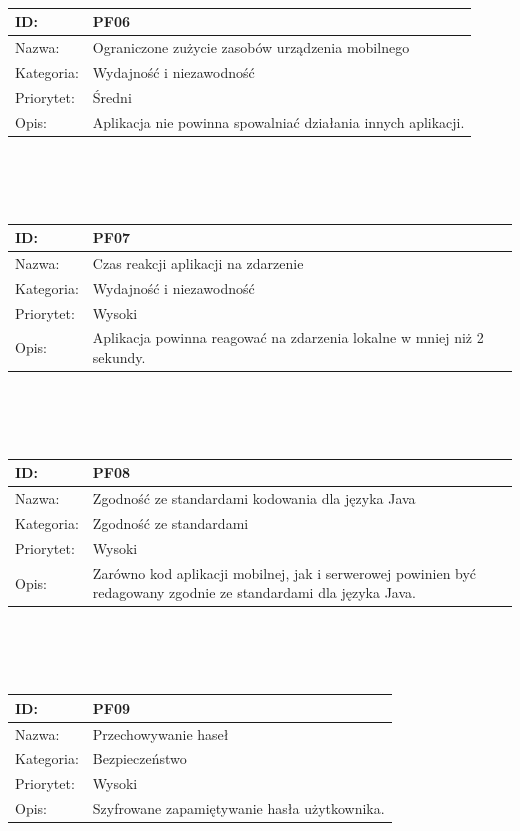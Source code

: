 \documentclass[11pt,a4paper,polish,thesis]{dcsbook}
\begin{document}
\begin{tabular}{|p{2cm}|p{12cm}|}
\\ \hline \end{tabular} \\\\\ \begin{tabular}{|p{2cm}|p{12cm}|}  \hline ID: &
PF06
\\ \hline Nazwa: &
Ograniczone zużycie zasobów urządzenia mobilnego
\\ \hline Kategoria: &
Wydajność i niezawodność
\\ \hline Priorytet: &
Średni
\\ \hline Opis: &
Aplikacja nie powinna spowalniać działania innych aplikacji.

\\ \hline \end{tabular} \\\\\ \begin{tabular}{|p{2cm}|p{12cm}|}  \hline ID: &
PF07
\\ \hline Nazwa: &
Czas reakcji aplikacji na zdarzenie
\\ \hline Kategoria: &
Wydajność i niezawodność
\\ \hline Priorytet: &
Wysoki
\\ \hline Opis: &
Aplikacja powinna reagować na zdarzenia lokalne w mniej niż 2 sekundy.

\\ \hline \end{tabular} \\\\\ \begin{tabular}{|p{2cm}|p{12cm}|}  \hline ID: &
PF08
\\ \hline Nazwa: &
Zgodność ze standardami kodowania dla języka Java
\\ \hline Kategoria: &
Zgodność ze standardami
\\ \hline Priorytet: &
Wysoki
\\ \hline Opis: &
Zarówno kod aplikacji mobilnej, jak i serwerowej powinien być redagowany zgodnie ze standardami dla języka Java.

\\ \hline \end{tabular} \\\\\ \begin{tabular}{|p{2cm}|p{12cm}|}  \hline ID: &
PF09
\\ \hline Nazwa: &
Przechowywanie haseł
\\ \hline Kategoria: &
Bezpieczeństwo
\\ \hline Priorytet: &
Wysoki
\\ \hline Opis: &
Szyfrowane zapamiętywanie hasła użytkownika.


\end{tabular}
\end{document}
